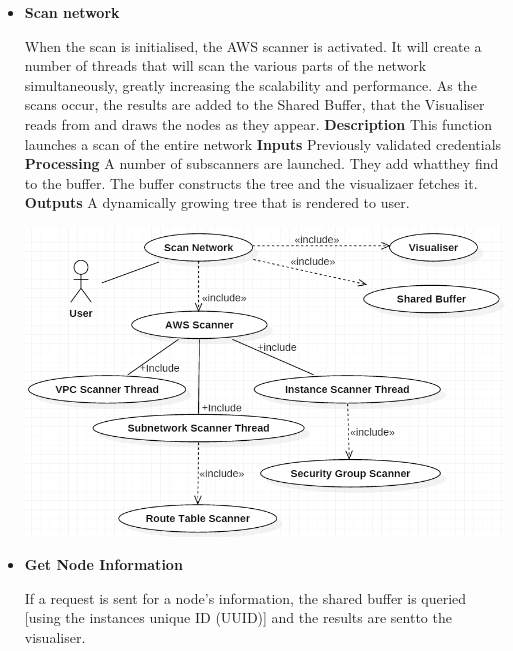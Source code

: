 \documentclass[a4paper,12pt]{report}
\begin{document}
\begin{itemize}
	\item \textbf{Scan network}
		\begin{flushleft}
		When the scan is initialised, the AWS scanner is activated. It will create a number of threads that will scan the various parts of the network simultaneously, greatly increasing the scalability and performance. As the scans occur, the results are added to the Shared Buffer, that the Visualiser reads from and draws the nodes as they appear.
\newline
\textbf{Description}
	\newline
	This function launches a scan of the entire network
	\newline
	\textbf{Inputs}
	\newline
	Previously validated credentials
	\newline
	\textbf{Processing}
	\newline
	A number of subscanners are launched. They add whatthey find to the buffer. The buffer constructs the tree and the visualizaer fetches it.
	\newline
	\textbf{Outputs}
	\newline
	A dynamically growing tree that is rendered to user.
		\end{flushleft}
		\begin{center}
  	 	\includegraphics[width=1\textwidth] {./Diagrams/ScanNetworkUseCase.png}\\[0.4cm]    
		\end{center}
\newpage
	\item \textbf{Get Node Information}
	\begin{flushleft}
	If a request is sent for a node's information, the shared buffer is queried [using the instances unique ID (UUID)] and the results are sentto the visualiser.

\end{flushleft}
\end{itemize}
\end{document}
